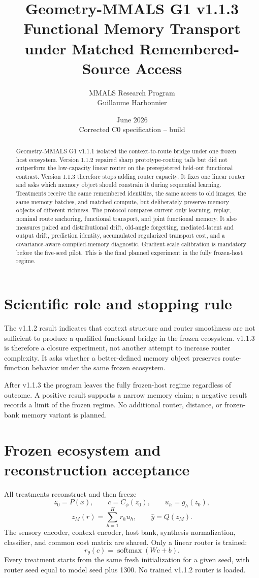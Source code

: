 \documentclass[11pt]{article}
\title{\textbf{Geometry-MMALS G1 v1.1.3}\\Functional Memory Transport under Matched Remembered-Source Access}
\author{MMALS Research Program\\Guillaume Harbonnier}
\date{June 2026\\Corrected C0 specification -- build \code{functional-memory-transport-c0-r2}}
\begin{document}
\maketitle
\begin{abstract}
Geometry-MMALS G1 v1.1.1 isolated the context-to-route bridge under one frozen host ecosystem. Version 1.1.2 repaired sharp prototype-routing tails but did not outperform the low-capacity linear router on the preregistered held-out functional contrast. Version 1.1.3 therefore stops adding router capacity. It fixes one linear router and asks which memory object should constrain it during sequential learning. Treatments receive the same remembered identities, the same access to old images, the same memory batches, and matched compute, but deliberately preserve memory objects of different richness. The protocol compares current-only learning, replay, nominal route anchoring, functional transport, and joint functional memory. It also measures paired and distributional drift, old-angle forgetting, mediated-latent and output drift, prediction identity, accumulated regularized transport cost, and a covariance-aware compiled-memory diagnostic. Gradient-scale calibration is mandatory before the five-seed pilot. This is the final planned experiment in the fully frozen-host regime.
\end{abstract}

\section{Scientific role and stopping rule}
The v1.1.2 result indicates that context structure and router smoothness are not sufficient to produce a qualified functional bridge in the frozen ecosystem. v1.1.3 is therefore a closure experiment, not another attempt to increase router complexity. It asks whether a better-defined memory object preserves route-function behavior under the same frozen ecosystem.

After v1.1.3 the program leaves the fully frozen-host regime regardless of outcome. A positive result supports a narrow memory claim; a negative result records a limit of the frozen regime. No additional router, distance, or frozen-bank memory variant is planned.

\section{Frozen ecosystem and reconstruction acceptance}
All treatments reconstruct and then freeze
\[
z_0=P(x),\qquad c=C_\phi(z_0),\qquad u_h=g_h(z_0),
\]
\[
z_M(r)=\sum_{h=1}^{H}r_hu_h,\qquad \hat y=Q(z_M).
\]
The sensory encoder, context encoder, host bank, synthesis normalization, classifier, and common cost matrix are shared. Only a linear router is trained:
\[
r_\theta(c)=\operatorname{softmax}(Wc+b).
\]
Every treatment starts from the same fresh initialization for a given seed, with router seed equal to model seed plus 1300. No trained v1.1.2 router is loaded.
\end{document}
